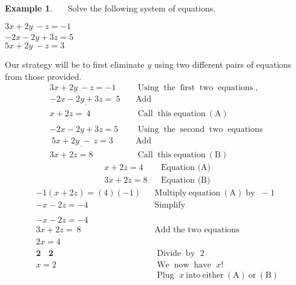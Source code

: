 \documentclass[12pt]{book}
\theoremstyle{definition}
\newtheorem{example}{Example}
\newcommand{\tmmathbf}[1]{\ensuremath{\boldsymbol{#1}}}
\newcommand{\tmop}[1]{\ensuremath{\operatorname{#1}}}
\begin{document}
\begin{example}~~~Solve the following system of equations.
\begin{center}
		$3 x + 2 y~ - z=- 1~$\\
		$- 2 x - 2 y + 3 z=5$~~~~~~~\\
		$5 x + 2 y~ - z=3~~~~$
\end{center}
Our strategy will be to first eliminate $y$ using two different pairs of equations from those provided.
	\begin{eqnarray*}
    3 x + 2 y~ - z = - 1 &  & \tmop{Using} \tmop{the} \tmop{first} \tmop{two}
    \tmop{equations},\\
    \underline{- 2 x - 2 y + 3 z = ~5~} &  & \tmop{Add} \\
    x + 2 z = ~4~ &  & \tmop{Call} \tmop{this} \tmop{equation~(A)}\\
    &  & \\
    - 2 x - 2 y + 3 z = 5 &  & \tmop{Using} \tmop{the} \tmop{second}
    \tmop{two} \tmop{equations}\\
    \underline{~5 x + 2 y~ -~ z = 3} &  & \tmop{Add}\\
    3 x + 2 z = 8 &  & \tmop{Call} \tmop{this} \tmop{equation~(B)}%
 \end{eqnarray*}
 \begin{eqnarray*}
    x + 2 z = 4 &  & \text{Equation~(A)}\\
    3 x + 2 z = 8 &  & \text{Equation~(B)}%
 \end{eqnarray*}
 \begin{eqnarray*}
    - 1 (x + 2 z) = (4) (- 1) &  & \tmop{Multiply~equation~(A)} \tmop{by~} - 1\\
    - x - 2 z = - 4~~~~~~ &  & \tmop{Simplify}\\
    &  & \\
    - x - 2 z = - 4 &  &\\
    \underline{3 x + 2 z = ~8~} &  & \text{Add~the~two~equations}\\
    2 x = 4~~ &  & \\
    \tmmathbf{\overline{2} ~~~~ \overline{2}}~~ &  &\tmop{Divide} \tmop{by~} 2 \\
    x = 2~~ &  & \tmop{We} \tmop{now} \tmop{have~} x!\\
    &  &  \tmop{Plug~} x \tmop{~into~either~(A)~or~(B)}
 \end{eqnarray*}

\end{example}
\end{document}
